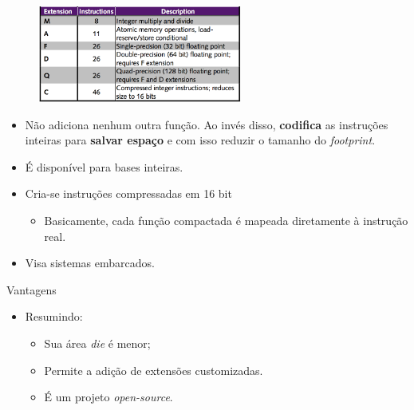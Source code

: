 \documentclass[red, aspectratio=169, xcolor=dvipsnames]{beamer}
\let\olditem=\item%
\renewcommand{\item}{\olditem \justifying}
\begin{document}
\begin{frame}%
	\begin{figure}
		\centering
		\label{fig:bi2}
		\includegraphics[width=0.6\textwidth]{img/base-instruction-b.png}
	\end{figure}
	\begin{itemize}
		\item Não adiciona nenhum outra função. Ao invés disso, \textbf{codifica} as instruções inteiras para \textbf{salvar espaço} e com isso reduzir o tamanho do \textit{footprint}.
		
		\item É disponível para bases inteiras.%
		
		\item Cria-se instruções compressadas em 16 bit
		\begin{itemize}
			\item Basicamente, cada função compactada é mapeada diretamente à instrução real.
		\end{itemize}
	
		\item Visa sistemas embarcados.
	
	\end{itemize}
\end{frame}

\begin{frame}{Vantagens}
	\begin{itemize}
		\item Resumindo:
		\begin{itemize}
			\setlength{\itemsep}{1.7em}
			\item Sua área \textit{die} é menor;
			\item Permite a adição de extensões customizadas.
			\item É um projeto \textit{open-source}.
		\end{itemize}
	\end{itemize}
\end{frame}
\end{document}
